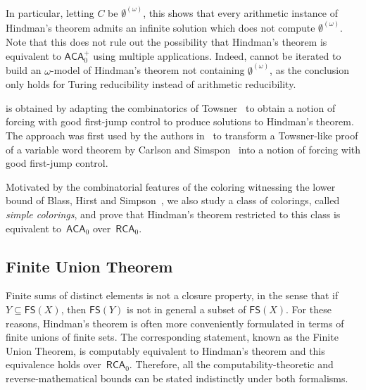 \documentclass{article}
\newcommand{\RCA}[0]{\mathsf{RCA}}
\newcommand{\ACA}[0]{\mathsf{ACA}}
\newcommand{\NN}[0]{\mathbb{N}}
\newcommand{\FS}[0]{\mathsf{FS}} %
\numberwithin{theorem}{section}
\newtheorem{maintheorem}[theorem]{Main Theorem}
\begin{document}

In particular, letting $C$ be $\emptyset^{(\omega)}$, this shows that every arithmetic instance of Hindman's theorem admits an infinite solution which does not compute $\emptyset^{(\omega)}$.
Note that this does not rule out the possibility that Hindman's theorem is equivalent to $\ACA_0^+$ using multiple applications. Indeed,  cannot be iterated to build an $\omega$-model of Hindman's theorem not containing $\emptyset^{(\omega)}$, as the conclusion only holds for Turing reducibility instead of arithmetic reducibility.

 is obtained by adapting the combinatorics of Towsner~\cite{towsnerSimpleProofDifficult2012} to obtain a notion of forcing with good first-jump control to produce solutions to Hindman's theorem. The approach was first used by the authors in~\cite{liu2026reverse} to transform a Towsner-like proof of a variable word theorem by Carlson and Simspon~\cite{carlson1984dual} into a notion of forcing with good first-jump control.

Motivated by the combinatorial features of the coloring witnessing the lower bound of Blass, Hirst and Simpson~\cite{blassLogicalAnalysisTheorems1987}, we also study a class of colorings, called \emph{simple colorings}, and prove that Hindman's theorem restricted to this class is equivalent to~$\ACA_0$ over~$\RCA_0$.

\subsection{Finite Union Theorem}

Finite sums of distinct elements is not a closure property, in the sense that if $Y \subseteq \FS(X)$, then $\FS(Y)$ is not in general a subset of $\FS(X)$. For these reasons, Hindman's theorem is often more conveniently formulated in terms of finite unions of finite sets. The corresponding statement, known as the Finite Union Theorem, is computably equivalent to Hindman's theorem and this equivalence holds over~$\RCA_0$. Therefore, all the computability-theoretic and reverse-mathematical bounds can be stated indistinctly under both formalisms.
\end{document}
